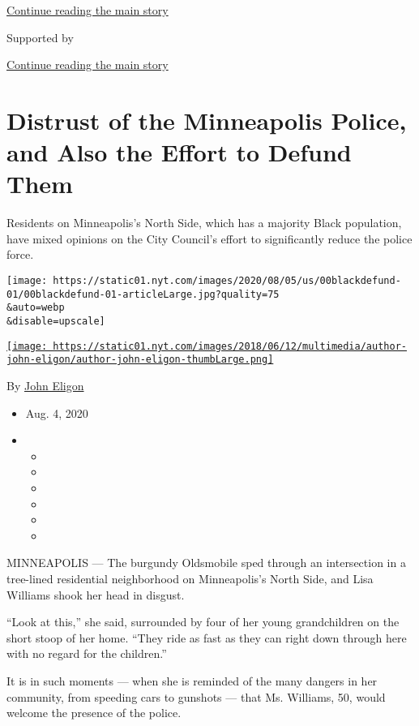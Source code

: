 \protect\hyperlink{after-top}{Continue reading the main story}

Supported by

\protect\hyperlink{after-sponsor}{Continue reading the main story}

\hypertarget{distrust-of-the-minneapolis-police-and-also-the-effort-to-defund-them}{%
\section{Distrust of the Minneapolis Police, and Also the Effort to
Defund
Them}\label{distrust-of-the-minneapolis-police-and-also-the-effort-to-defund-them}}

Residents on Minneapolis's North Side, which has a majority Black
population, have mixed opinions on the City Council's effort to
significantly reduce the police force.

\texttt{[image: https://static01.nyt.com/images/2020/08/05/us/00blackdefund-01/00blackdefund-01-articleLarge.jpg?quality=75\\\&auto=webp\\\&disable=upscale]}

\href{https://www.nytimes.com/by/john-eligon}{\texttt{[image: https://static01.nyt.com/images/2018/06/12/multimedia/author-john-eligon/author-john-eligon-thumbLarge.png]}}

By \href{https://www.nytimes.com/by/john-eligon}{John Eligon}

\begin{itemize}
\item
  Aug. 4, 2020
\item
  \begin{itemize}
  \item
  \item
  \item
  \item
  \item
  \item
  \end{itemize}
\end{itemize}

MINNEAPOLIS --- The burgundy Oldsmobile sped through an intersection in
a tree-lined residential neighborhood on Minneapolis's North Side, and
Lisa Williams shook her head in disgust.

``Look at this,'' she said, surrounded by four of her young
grandchildren on the short stoop of her home. ``They ride as fast as
they can right down through here with no regard for the children.''

It is in such moments --- when she is reminded of the many dangers in
her community, from speeding cars to gunshots --- that Ms. Williams, 50,
would welcome the presence of the police.

